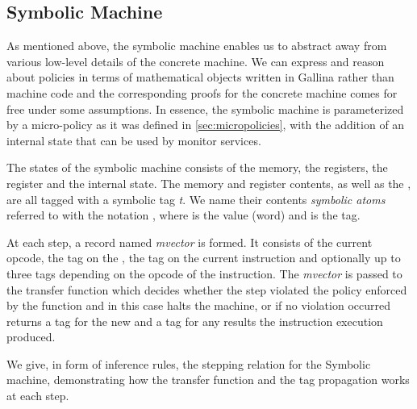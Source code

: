 

\subsection{Symbolic Machine}\label{sec:symbolic}

As mentioned above, the symbolic machine enables us to abstract away from
various low-level details of the concrete machine. We can express and reason
about policies in terms of mathematical objects written in Gallina rather than
machine code and the corresponding proofs for the concrete machine comes for
free under some assumptions.
In essence, the symbolic machine is parameterized by a micro-policy as it was
defined in \ref{sec:micropolicies}, with the addition of an internal state
that can be used by monitor services.

The states of the symbolic machine consists of the memory, the
registers, the \pc register and the internal state. The memory and
register contents, as well as the \pc, are all tagged with a symbolic
tag \textit{t}. We name their contents \textit{symbolic atoms}
referred to with the notation , where  is
the value (word) and  is the tag.

At each step, a record named \emph{mvector} is formed. It consists of
the current opcode, the tag on the \pc, the tag on the current
instruction and optionally up to three tags depending on the opcode of
the instruction. The \emph{mvector} is passed to the transfer
function which decides whether the step violated the policy enforced
by the \TRANSFER function and in this case halts the machine, or if no
violation occurred returns a tag for the new \pc and a tag for any
results the instruction execution produced.

We give, in form of inference rules, the stepping relation for the
Symbolic machine, demonstrating how the transfer function and the
tag propagation works at each step.

